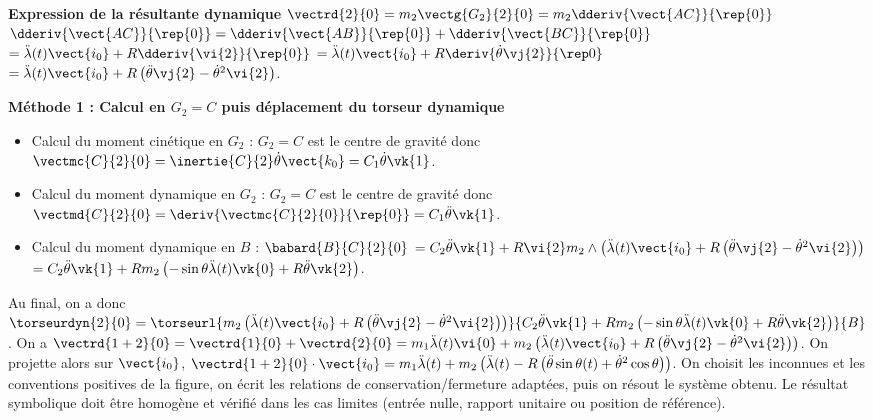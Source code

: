 \begin{corrigebox}
\textbf{Expression de la résultante dynamique}
$\vectrd{2}{0}=m_2\vectg{G_2}{2}{0} = m_2\dderiv{\vect{AC}}{\rep{0}}$
$\dderiv{\vect{AC}}{\rep{0}}= \dderiv{\vect{AB}}{\rep{0}}+\dderiv{\vect{BC}}{\rep{0}}$
$= \ddot{\lambda}(t) \vect{i_0} + R \dderiv{\vi{2}}{\rep{0}}$
$= \ddot{\lambda}(t) \vect{i_0} + R \deriv{\dot{\theta} \vj{2}}{\rep0}$
$= \ddot{\lambda}(t) \vect{i_0} + R \left(\ddot{\theta} \vj{2} - \dot{\theta}^2 \vi{2}\right) $.

\textbf{Méthode 1 : Calcul en $G_2=C$ puis déplacement du torseur dynamique}
\begin{itemize}
\item Calcul du moment cinétique en $G_2$ : $G_2=C$ est le centre de gravité donc $\vectmc{C}{2}{0}=\inertie{C}{2}\dot{\theta}\vect{k_0} = C_1  \dot{\theta} \vk{1}$.
\item Calcul du moment dynamique en $G_2$ : $G_2=C$ est le centre de gravité donc $\vectmd{C}{2}{0}=\deriv{\vectmc{C}{2}{0}}{\rep{0}}= C_1  \ddot{\theta} \vk{1}$.
\item Calcul du moment dynamique en $B$ : $\babard{B}{C}{2}{0} $
$= C_2  \ddot{\theta} \vk{1} + R\vi{2}m_2\wedge\left(  \ddot{\lambda}(t) \vect{i_0} + R \left(\ddot{\theta} \vj{2} - \dot{\theta}^2 \vi{2}\right)\right)$
$= C_2  \ddot{\theta} \vk{1} + Rm_2\left( -\sin \theta \ddot{\lambda}(t) \vk{0} + R \ddot{\theta} \vk{2}\right)$.
\end{itemize}

Au final, on a donc $\torseurdyn{2}{0}=\torseurl{
m_2\left(\ddot{\lambda}(t) \vect{i_0} + R \left(\ddot{\theta} \vj{2} - \dot{\theta}^2 \vi{2}\right)\right)
}{
C_2  \ddot{\theta} \vk{1} + Rm_2\left( -\sin \theta \ddot{\lambda}(t) \vk{0} + R \ddot{\theta} \vk{2}\right)
}{B}$.
On a $\vectrd{1+2}{0}=\vectrd{1}{0}+\vectrd{2}{0}=m_1\ddot{\lambda}(t)\vi{0}+m_2\left(\ddot{\lambda}(t) \vect{i_0} + R \left(\ddot{\theta} \vj{2} - \dot{\theta}^2 \vi{2}\right)\right)$.
On projette alors sur $\vect{i_0}$,
$\vectrd{1+2}{0}\cdot \vect{i_0} =m_1\ddot{\lambda}(t)+m_2\left(\ddot{\lambda}(t)-R \left(\ddot{\theta} \sin\theta(t)  + \dot{\theta}^2 \cos\theta \right)\right) $.
On choisit les inconnues et les conventions positives de la figure,
        on écrit les relations de conservation/fermeture adaptées, puis on résout le
        système obtenu. Le résultat symbolique doit être homogène et vérifié dans les cas
        limites (entrée nulle, rapport unitaire ou position de référence).
\end{corrigebox}
